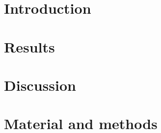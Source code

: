 \documentclass[a4paper]{article}
\begin{document}
\section*{Introduction}



\section*{Results}



\section*{Discussion}



\section*{Material and methods}


\end{document}
